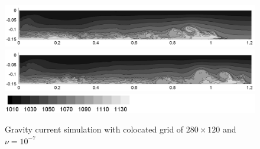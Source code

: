 \begin{figure}[htbp]
\begin{center}
\includegraphics[scale=0.55]{../figures/colocated/Fig9case/280-120-0075-VE-7-Surf0/07.png}    \includegraphics[scale=0.55]{../figures/colocated/Fig9case/280-120-0075-VE-7-Surf0/08.png}
\includegraphics[scale=0.55]{../figures/colocated/Fig9case/label.png}
    \caption{Gravity current simulation with colocated grid of $280 \times 120$ and $\nu=10^{-7}$}
    \label{fig:280-120-075-VE-7-Surf0}
  \end{center}
\end{figure}



